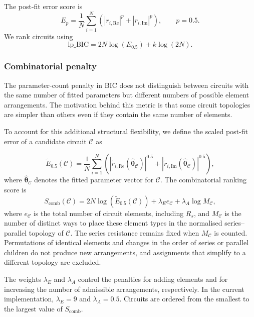 \documentclass[
    11pt,
    a4paper,
    oneside
]{article}
\begin{document}
The post-fit error score is
\[
E_p=\frac{1}{N}\sum_{i=1}^{N}
\left(
|r_{i,\mathrm{Re}}|^p+|r_{i,\mathrm{Im}}|^p
\right),
\qquad p=0.5.
\]
We rank circuits using
\[
\mathrm{lp\_BIC}=2N\log(E_{0.5})+k\log(2N).
\]

\subsubsection{Combinatorial penalty}

The parameter-count penalty in BIC does not distinguish between circuits with
the same number of fitted parameters but different numbers of possible element
arrangements. The motivation behind this metric is that some circuit topologies
are simpler than others even if they contain the same number of elements.

To account for this additional structural flexibility, we define
the scaled post-fit error of a candidate circuit \(\mathcal{C}\) as

\begin{equation}\label{eq:scaled_lp_error}
\widetilde E_{0.5}(\mathcal{C})
=\frac{1}{N}\sum_{i=1}^{N}
\left(
\left|\widetilde r_{i,\mathrm{Re}}
    (\widehat{\boldsymbol{\theta}}_{\mathcal{C}})\right|^{0.5}
+
\left|\widetilde r_{i,\mathrm{Im}}
    (\widehat{\boldsymbol{\theta}}_{\mathcal{C}})\right|^{0.5}
\right),
\end{equation}
where \(\widehat{\boldsymbol{\theta}}_{\mathcal{C}}\) denotes the fitted
parameter vector for \(\mathcal{C}\). The combinatorial ranking score is
\begin{equation}\label{eq:combinatorial_score}
S_{\mathrm{comb}}(\mathcal{C})
=2N\log\!\left(\widetilde E_{0.5}(\mathcal{C})\right)
+\lambda_E e_{\mathcal{C}}
+\lambda_A\log M_{\mathcal{C}},
\end{equation}
where \(e_{\mathcal{C}}\) is the total number of circuit elements,
including \(R_s\), and \(M_{\mathcal{C}}\) is the number of distinct ways to
place these element types in the normalised series--parallel
topology of \(\mathcal{C}\). The series resistance remains fixed when
\(M_{\mathcal{C}}\) is counted. Permutations of identical elements and changes
in the order of series or parallel children do not produce new arrangements,
and assignments that simplify to a different topology are excluded.

The weights \(\lambda_E\) and \(\lambda_A\) control the penalties for adding
elements and for increasing the number of admissible arrangements,
respectively. In the current implementation, \(\lambda_E=9\) and
\(\lambda_A=0.5\). Circuits are ordered from the smallest to the largest value
of \(S_{\mathrm{comb}}\). 
\end{document}
